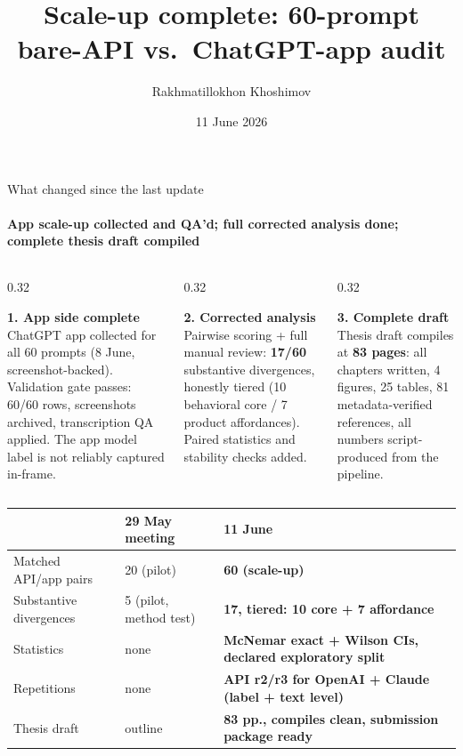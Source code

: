 \documentclass[aspectratio=169,onlytextwidth]{beamer}
\title{Scale-up complete: 60-prompt bare-API vs.\ ChatGPT-app audit}
\author{Rakhmatillokhon Khoshimov}
\date{11 June 2026}
\institute{Department of Informatics \\ Social Computing Group}
\newcommand{\oktext}[1]{\textbf{#1}}
\begin{document}
\maketitle

\begin{frame}[shrink=10]{What changed since the last update}
\framesubtitle{App scale-up collected and QA'd; full corrected analysis done; complete thesis draft compiled}
\begin{columns}[T,totalwidth=\textwidth]
\begin{column}{0.32\textwidth}
\begin{block}{\oktext{1. App side complete}}
\small ChatGPT app collected for all 60 prompts (8 June, screenshot-backed). Validation gate passes: 60/60 rows, screenshots archived, transcription QA applied. The app model label is not reliably captured in-frame.
\end{block}
\end{column}
\begin{column}{0.32\textwidth}
\begin{block}{\oktext{2. Corrected analysis}}
\small Pairwise scoring + full manual review: \textbf{17/60} substantive divergences, honestly tiered (10 behavioral core / 7 product affordances). Paired statistics and stability checks added.
\end{block}
\end{column}
\begin{column}{0.32\textwidth}
\begin{block}{\oktext{3. Complete draft}}
\small Thesis draft compiles at \textbf{83 pages}: all chapters written, 4 figures, 25 tables, 81 metadata-verified references, all numbers script-produced from the pipeline.
\end{block}
\end{column}
\end{columns}
\vspace{0.2cm}
\small
\begin{tabular}{lll}
\toprule
& \textbf{29 May meeting} & \textbf{11 June} \\
\midrule
Matched API/app pairs & 20 (pilot) & \textbf{60 (scale-up)} \\
Substantive divergences & 5 (pilot, method test) & \textbf{17, tiered: 10 core + 7 affordance} \\
Statistics & none & \textbf{McNemar exact + Wilson CIs, declared exploratory split} \\
Repetitions & none & \textbf{API r2/r3 for OpenAI + Claude (label + text level)} \\
Thesis draft & outline & \textbf{83 pp., compiles clean, submission package ready} \\
\bottomrule
\end{tabular}
\end{frame}
\end{document}
